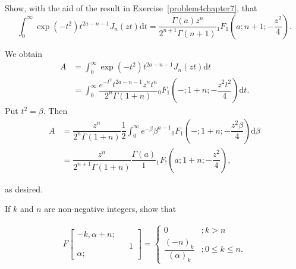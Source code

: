 \begin{problem}\label{problem5chapter7}
Show, with the aid of the result in Exercise~\ref{problem4chapter7}, that
$$\displaystyle\int_0^{\infty} \exp(-t^2) t^{2a-n-1}J_n(zt) \mathrm{d}t = \dfrac{\Gamma(a)z^n}{2^{n+1}\Gamma(n+1)} {}_1F_1 \left( a; n+1; -\dfrac{z^2}{4} \right).$$
\end{problem}
\begin{solution}
We obtain
$$\begin{array}{ll}
A &= \displaystyle\int_0^{\infty} \exp(-t^2) t^{2a-n-1} J_n(zt) \mathrm{d}t \\
&= \displaystyle\int_0^{\infty} \dfrac{e^{-t^2}t^{2a-n-1} z^n t^n}{2^n \Gamma(1+n)} {}_0F_1 \left( -;1+n;-\dfrac{z^2t^2}{4} \right) \mathrm{d}t.
\end{array}$$
Put $t^2=\beta$. Then
$$\begin{array}{ll}
A &= \dfrac{z^n}{2^n \Gamma(1+n)} \dfrac{1}{2} \displaystyle\int_0^{\infty} e^{-\beta} \beta^{a-1} {}_0F_1 \left( - ; 1+n; - \dfrac{z^2 \beta}{4} \right) \mathrm{d} \beta \\
&= \dfrac{z^n}{2^{n+1}\Gamma(1+n)} \dfrac{\Gamma(a)}{1} {}_1F_! \left( a; 1+n; -\dfrac{z^2}{4} \right),
\end{array}$$

as desired.
\end{solution}
\begin{problem}\label{problem6chapter7}
If $k$ and $n$ are non-negative integers, show that

$$\begin{array}{ll}
F \left[ \begin{array}{rlr}
-k, \alpha+n; & & \\
& & 1 \\
\alpha; & & 
\end{array} \right] = \left\{
\begin{array}{ll}
0 &; k > n \\
\dfrac{(-n)_k}{(\alpha)_k} &; 0 \leq k \leq n.
\end{array}
\right.
\end{array}$$
\end{problem}

